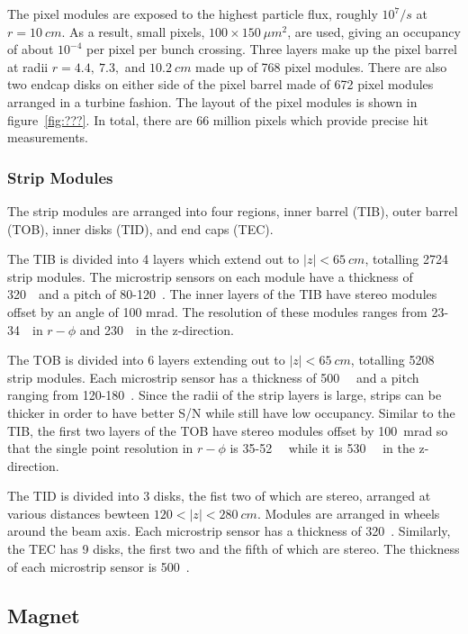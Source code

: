 The pixel modules are exposed to the highest particle flux, roughly $10^7/s$
at $r=10~cm$.  As a result, small pixels, $100\times150~\mu m^2$, are used,
giving an occupancy of about $10^{-4}$ per pixel per bunch crossing. Three
layers make up the pixel barrel at radii $r=4.4,~7.3,$ and $10.2~cm$ made
up of 768 pixel modules.  There are also two endcap disks on either side of 
the pixel barrel made of 672 pixel modules arranged in a turbine fashion. 
The layout of the pixel modules is shown in figure~\ref{fig:???}.
In total, there are 66 million pixels which provide precise hit measurements.

\subsubsection{Strip Modules}

The strip modules are arranged into four regions, inner barrel (TIB), 
outer barrel (TOB), inner disks (TID), and end caps (TEC). 

The TIB is divided into 4 layers which extend out to $|z|<65~cm$, totalling
2724 strip modules.  The microstrip sensors on each module have a thickness
of 320~\microns~and a pitch of 80-120~\microns. The inner layers of the TIB
have stereo modules offset by an angle of 100 mrad.  The resolution of these
modules ranges from 23-34~\microns~in $r-\phi$ and 230~\microns~in 
the z-direction.

The TOB is divided into 6 layers extending out to $|z|<65~cm$, totalling
5208 strip modules.  Each microstrip sensor has a thickness of 500~\microns~
and a pitch ranging from 120-180~\microns.  Since the radii of the strip
layers is large, strips can be thicker in order to have better S/N while 
still have low occupancy.  Similar to the TIB, the first two layers of the
TOB have stereo modules offset by 100~mrad so that the single point resolution
in $r-\phi$ is 35-52~\microns~ while it is 530~\microns~ in the z-direction.

The TID is divided into 3 disks, the fist two of which are stereo, arranged
at various distances bewteen $120<|z|<280~cm$.  Modules
are arranged in wheels around the beam axis.  Each microstrip sensor has a 
thickness of 320~\microns.  Similarly, the TEC has 9 disks, the first two and 
the fifth of which are stereo.  The thickness of each microstrip sensor
is 500~\microns. 

\subsection{Magnet}
\label{sec:Magnet}

